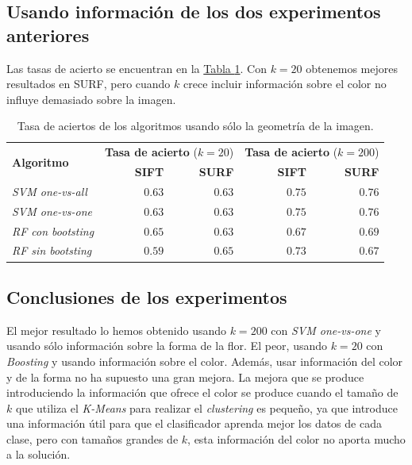 \documentclass[paper=a4, fontsize=11pt]{article} %
\numberwithin{equation}{section} %
\numberwithin{figure}{section} %
\numberwithin{table}{section} %
\begin{document}
\subsection{Usando información de los dos experimentos anteriores}

Las tasas de acierto se encuentran en la \hyperref[resAmbos]{Tabla \ref*{resAmbos}}. Con $k=20$ obtenemos mejores resultados en SURF, pero cuando $k$ crece incluir información sobre el color no influye demasiado sobre la imagen.

\begin{table}[H]
  \begin{tabular}{l|r|r||r|r}
    \multirow{2}{*}{\textbf{Algoritmo}} & \multicolumn{2}{c}{\textbf{Tasa de acierto} ($k=20$)} & \multicolumn{2}{c}{\textbf{Tasa de acierto} ($k=200$)} \\
    \cline{2-5}
    & \textbf{SIFT} & \textbf{SURF} & \textbf{SIFT} & \textbf{SURF} \\
    \hline
    \textit{SVM one-vs-all} & $\qquad 0.63$ & $\qquad 0.63$ & $\qquad 0.75$ & $\qquad 0.76$ \\ 
    \textit{SVM one-vs-one} & $\qquad 0.63$ & $\qquad 0.63$ & $\qquad 0.75$ & $\qquad 0.76$ \\
    \textit{RF con bootsting} & $\qquad 0.65$ & $\qquad 0.63$ & $\qquad 0.67$ & $\qquad 0.69$ \\
    \textit{RF sin bootsting} & $\qquad 0.59$ & $\qquad 0.65$ & $\qquad 0.73$ & $\qquad 0.67$ \\
  \end{tabular}
  \label{resAmbos}
  \caption{Tasa de aciertos de los algoritmos usando sólo la geometría de la imagen.}
\end{table}

\subsection{Conclusiones de los experimentos}
El mejor resultado lo hemos obtenido usando $k=200$ con \textit{SVM one-vs-one} y usando sólo información sobre la forma de la flor. El peor, usando $k=20$ con \textit{Boosting} y usando información sobre el color. Además, usar información del color y de la forma no ha supuesto una gran mejora. La mejora que se produce introduciendo la información que ofrece el color se produce cuando el tamaño de $k$ que utiliza el \textit{K-Means} para realizar el \textit{clustering} es pequeño, ya que introduce una información útil para que el clasificador aprenda mejor los datos de cada clase, pero con tamaños grandes de $k$, esta información del color no aporta mucho a la solución.

\end{document}
